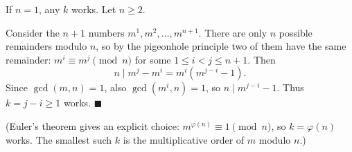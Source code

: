 If $n=1$, any $k$ works. Let $n\ge2$.

Consider the $n+1$ numbers $m^1,m^2,\dots,m^{n+1}$. There are only $n$ possible remainders modulo $n$, so by the pigeonhole principle two of them have the same remainder: $m^i\equiv m^j\pmod n$ for some $1\le i<j\le n+1$. Then
\[
n\mid m^j-m^i=m^i\left(m^{j-i}-1\right).
\]
Since $\gcd(m,n)=1$, also $\gcd(m^i,n)=1$, so $n\mid m^{j-i}-1$. Thus $k=j-i\ge1$ works. $\blacksquare$

(Euler's theorem gives an explicit choice: $m^{\varphi(n)}\equiv1\pmod n$, so $k=\varphi(n)$ works. The smallest such $k$ is the multiplicative order of $m$ modulo $n$.)
